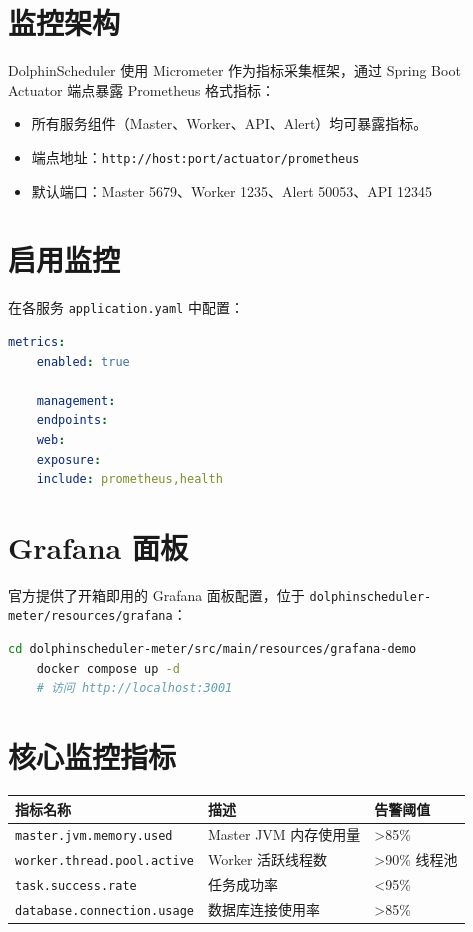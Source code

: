 \documentclass[UTF8, a4paper]{ctexbook}
\begin{document}
\section{监控架构}
	
DolphinScheduler 使用 Micrometer 作为指标采集框架，通过 Spring Boot Actuator 端点暴露 Prometheus 格式指标：
	
\begin{itemize}
	\item 所有服务组件（Master、Worker、API、Alert）均可暴露指标。
	\item 端点地址：\texttt{http://host:port/actuator/prometheus}
	\item 默认端口：Master 5679、Worker 1235、Alert 50053、API 12345
\end{itemize}
	
\section{启用监控}
	
在各服务 \texttt{application.yaml} 中配置：
	
\begin{lstlisting}[language=yaml]
	metrics:
	enabled: true
	
	management:
	endpoints:
	web:
	exposure:
	include: prometheus,health
\end{lstlisting}
	
\section{Grafana 面板}
	
官方提供了开箱即用的 Grafana 面板配置，位于 \texttt{dolphinscheduler-meter/resources/grafana}：
	
\begin{lstlisting}[language=bash]
	cd dolphinscheduler-meter/src/main/resources/grafana-demo
	docker compose up -d
	# 访问 http://localhost:3001
\end{lstlisting}
	
\section{核心监控指标}
	
\begin{longtable}{p{5cm}p{5cm}p{3cm}}
	\toprule
	\textbf{指标名称} & \textbf{描述} & \textbf{告警阈值} \\
	\midrule
	\texttt{master.jvm.memory.used} & Master JVM 内存使用量 & >85\% \\
	\texttt{worker.thread.pool.active} & Worker 活跃线程数 & >90\% 线程池 \\
	\texttt{task.success.rate} & 任务成功率 & <95\% \\
	\texttt{database.connection.usage} & 数据库连接使用率 & >85\% \\
	\bottomrule
\end{longtable}
	
\end{document}

